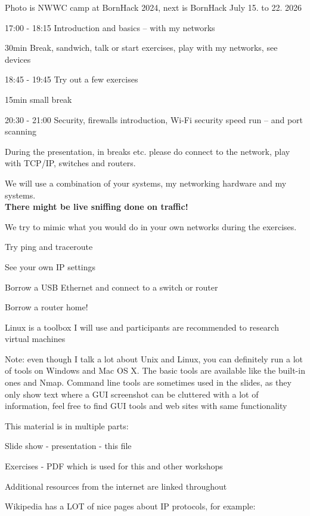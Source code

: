 \documentclass[Screen16to9,17pt]{foils}
\begin{document}
Photo is NWWC camp at BornHack 2024, next is BornHack July 15. to 22. 2026 



\begin{list2}
\item 17:00 - 18:15 Introduction and basics -- with my networks
\item 30min Break, sandwich, talk or start exercises, play with my networks, see devices
\item 18:45 - 19:45 Try out a few exercises
\item 15min small break
\item 20:30 - 21:00 Security, firewalls introduction, Wi-Fi security speed run -- and port scanning
\end{list2}

During the presentation, in breaks etc. please do connect to the network, play with TCP/IP, switches and routers. 


We will use a combination of your systems, my networking hardware and my systems.\\
{\color{red} \bf There might be live sniffing done on traffic!}

We try to mimic what you would do in your own networks during the exercises.

\begin{list2}
\item Try ping and traceroute
\item See your own IP settings
\item Borrow a USB Ethernet and connect to a switch or router
\item Borrow a router home!
\end{list2}

Linux is a toolbox I will use and participants are recommended to research virtual machines

Note: even though I talk a lot about Unix and Linux, you can definitely run a lot of tools on Windows and Mac OS X. The basic tools are available like the built-in ones and Nmap. Command line tools are sometimes used in the slides, as they only show text where a GUI screenshot can be cluttered with a lot of information, feel free to find GUI tools and web sites with same functionality



\begin{list2}
\item This material is in multiple parts:

\item Slide show - presentation - this file
\item Exercises - PDF which is used for this and other workshops
\item Additional resources from the internet are linked throughout
\item Wikipedia has a LOT of nice pages about IP protocols, for example:
\end{list2}
\end{document}
